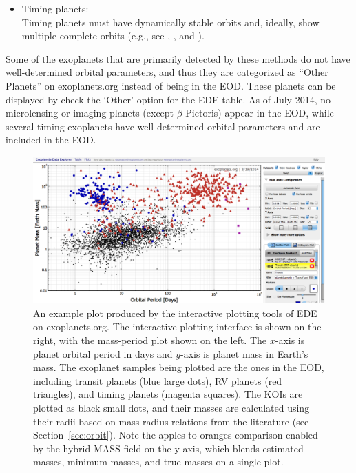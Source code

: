 \documentclass[11pt,preprint]{aastex}
\begin{document}
\begin{CJK*}{UTF8}{gbsn}
\begin{itemize}
\item Timing planets:\\
  Timing planets must have dynamically stable orbits and, ideally, show
  multiple complete orbits (e.g., see \citealt{Wittenmyer2012},
  \citealt{Horner2012}, and \citealt{Wittenmyer2013}). 

\end{itemize}
Some of the exoplanets that are primarily detected by these methods do
not have well-determined orbital parameters, and thus they are
categorized as ``Other Planets'' on exoplanets.org instead of being in
the EOD. These planets can be displayed by check the `Other' option
for the EDE table. As of July 2014, no microlensing or imaging
planets (except $\beta$ Pictoris) appear in the EOD, while several timing exoplanets have
well-determined orbital parameters and are included in the
EOD.


\begin{figure}[!htb]
\centering
\includegraphics[width=\textwidth]{fig/mass-per-interactive.eps}
\caption{
  An example plot produced by the interactive plotting tools of
  EDE on exoplanets.org. The interactive plotting interface is shown
  on the right, with the mass-period plot shown on the left. The
  $x$-axis is planet orbital period in days and $y$-axis is planet
  mass in Earth's mass. The exoplanet samples being plotted are the
  ones in the EOD, including transit planets (blue large dots), RV
  planets (red triangles), and timing planets (magenta squares). The
  KOIs are plotted as black small dots, and their masses are
  calculated using their radii based on mass-radius relations from the
  literature (see Section~\ref{sec:orbit}).  Note the
  apples-to-oranges comparison enabled by the hybrid MASS field on the y-axis, which blends estimated
  masses, minimum masses, and true masses on a single plot.}
\label{fig:koi}
\end{figure}


\end{CJK*}
\end{document}
